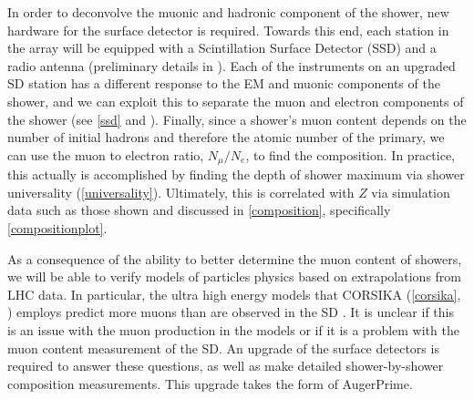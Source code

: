 In order to deconvolve the muonic and hadronic component of the shower, new hardware for the surface detector is required. Towards this end, each station in the array will be equipped with a Scintillation Surface Detector (SSD) and a radio antenna (preliminary details in \cite{dutchaera}). Each of the instruments on an upgraded SD station has a different response to the EM and muonic components of the shower, and we can exploit this to separate the muon and electron components of the shower (see \autoref{ssd} and \cite{primeuniv, univpart}). Finally, since a shower's muon content depends on the number of initial hadrons and therefore the atomic number of the primary, we can use the muon to electron ratio, $N_\mu /N_e$, to find the composition. In practice, this actually is accomplished by finding the depth of shower maximum via shower universality (\autoref{universality}\cite{univpart}). Ultimately, this is correlated with $Z$ via simulation data such as those shown and discussed in \autoref{composition}, specifically \autoref{compositionplot}.

As a consequence of the ability to better determine the muon content of showers, we will be able to verify models of particles physics based on extrapolations from LHC data. In particular, the ultra high energy models that CORSIKA (\autoref{corsika}, \cite{corsika}) employs predict more muons than are observed in the SD \cite{mudef}. It is unclear if this is an issue with the muon production in the models or if it is a problem with the muon content measurement of the SD. An upgrade of the surface detectors is required to answer these questions, as well as make detailed shower-by-shower composition measurements. This upgrade takes the form of AugerPrime.
